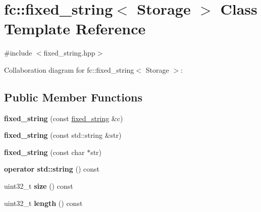 \hypertarget{classfc_1_1fixed__string}{}\section{fc\+:\+:fixed\+\_\+string$<$ Storage $>$ Class Template Reference}
\label{classfc_1_1fixed__string}


{\ttfamily \#include $<$fixed\+\_\+string.\+hpp$>$}



Collaboration diagram for fc\+:\+:fixed\+\_\+string$<$ Storage $>$\+:
\subsection*{Public Member Functions}
\begin{DoxyCompactItemize}
\item 
\mbox{\label{classfc_1_1fixed__string_ae62ce81d897fcbddce99d2ca12bdec72}} 
{\bfseries fixed\+\_\+string} (const \mbox{\hyperlink{classfc_1_1fixed__string}{fixed\+\_\+string}} \&c)
\item 
\mbox{\label{classfc_1_1fixed__string_ad6f3bfac3803d37701105a5c99b29513}} 
{\bfseries fixed\+\_\+string} (const std\+::string \&str)
\item 
\mbox{\label{classfc_1_1fixed__string_a5eccc792e29835a8a78e0a8bbc80c4c0}} 
{\bfseries fixed\+\_\+string} (const char $\ast$str)
\item 
\mbox{\label{classfc_1_1fixed__string_ab116ceac5d73d0b7bc21a0f6ec1cc976}} 
{\bfseries operator std\+::string} () const
\item 
\mbox{\label{classfc_1_1fixed__string_a047cef27f5a3c8e27eeb61ff41a24ffe}} 
uint32\+\_\+t {\bfseries size} () const
\item 
\mbox{\label{classfc_1_1fixed__string_a9b34ecd5656f66b66ffc879370041348}} 
uint32\+\_\+t {\bfseries length} () const
\item 
\mbox{\label{classfc_1_1fixed__string_ac833f83278eecca07c97a74e20caaf35}} 

\end{DoxyCompactItemize}
